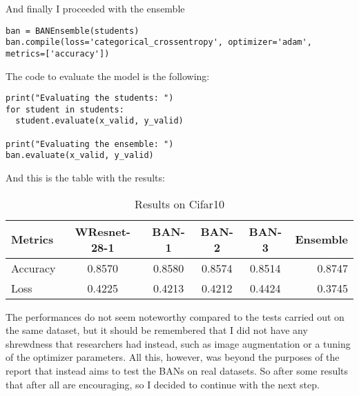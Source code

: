 And finally I proceeded with the ensemble\\
\lstset{language=Python}
\lstset{frame=lines}
\lstset{basicstyle=\footnotesize}
\begin{lstlisting}
ban = BANEnsemble(students)
ban.compile(loss='categorical_crossentropy', optimizer='adam', metrics=['accuracy'])

\end{lstlisting}

The code to evaluate the model is the following:\\
\lstset{language=Python}
\lstset{frame=lines}
\lstset{basicstyle=\footnotesize}
\begin{lstlisting}
print("Evaluating the students: ")
for student in students:
  student.evaluate(x_valid, y_valid)

print("Evaluating the ensemble: ")
ban.evaluate(x_valid, y_valid)
\end{lstlisting}
And this is the table with the results:\\
\begin{table}[h!]
  \begin{center}
    \caption{Results on Cifar10}
    \begin{tabular}{l|c|c|c|c|r} 
      \textbf{Metrics} & \textbf{WResnet-28-1} & \textbf{BAN-1} & \textbf{BAN-2} & \textbf{BAN-3} & \textbf{Ensemble}\\ 
      \hline
      Accuracy & 0.8570 & 0.8580 & 0.8574 & 0.8514 & 0.8747\\
      Loss & 0.4225 & 0.4213 & 0.4212 & 0.4424 & 0.3745\\

    \end{tabular}
  \end{center}
\end{table}

The performances do not seem noteworthy compared to the tests carried out on the same dataset, but it should be remembered that I did not have any shrewdness that researchers had instead, such as image augmentation or a tuning of the optimizer parameters. All this, however, was beyond the purposes of the report that instead aims to test the BANs on real datasets. So after some results that after all are encouraging, so I decided to continue with the next step.
